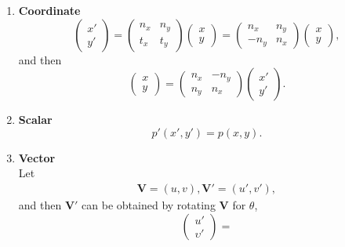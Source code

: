 \documentclass[review]{elsarticle}
\begin{document}
\begin{enumerate} 
	\item \textbf{Coordinate} \\
	\begin{equation}\label{TCoords:1}
	\left( \begin{array}{c}  x' \\  y' \end{array} \right) = \left( \begin{array}{cc}
	n_x & n_y \\
	t_x & t_y
	\end{array}\right)\left(\begin{array}{c} x \\ y \end{array}  \right) = \left( \begin{array}{cc}
	n_x & n_y \\
	-n_y & n_x
	\end{array}\right)\left(\begin{array}{c} x \\ y \end{array}  \right),
	\end{equation}
	and then 
	\begin{equation}\label{TCoords:2}
		\left( \begin{array}{c}  x \\  y \end{array} \right) = \left( \begin{array}{cc}
		n_x & -n_y \\
		n_y & n_x
		\end{array}\right)\left(\begin{array}{c} x' \\ y' \end{array}  \right).
	\end{equation}
	\item \textbf{Scalar} \\
	\begin{equation}\label{TScalar}
		p'(x',y')=p(x,y).    
	\end{equation}
	\item \textbf{Vector} \\
	Let
	\begin{eqnarray}
		\bm{V} = \left(u,v\right) ,
		\bm{V'} = \left(u',v'\right), 
	\end{eqnarray}
	and then $\bm{V'}$ can be obtained by rotating $\bm{V}$ for $\theta$,
	\begin{equation}\label{TVector:1}
	\left(\begin{array}{c} u' \\ \upsilon{'}  \end{array} \right) = 

\end{equation}
\end{enumerate}
\end{document}
